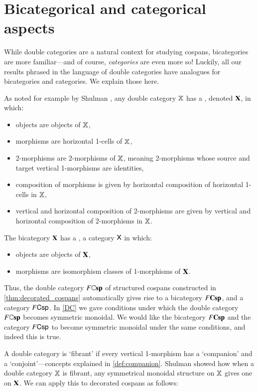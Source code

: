 \documentclass[reqno]{amsart}
\begin{document}
\section{Bicategorical and categorical aspects}
\label{spinoffs}

While double categories are a natural context for studying cospans, bicategories are more 
familiar---and of course, \emph{categories} are even more so!   Luckily, all our results 
phrased in the language of double categories have analogues for bicategories and categories.  
We explain those here.

As noted for example by Shulman \cite{Shulman2010}, any double category $\mathbf{\mathbb X}$ has a 
, denoted $\mathbf{X}$, in which:
\begin{itemize}
\item objects are objects of $\mathbf{\mathbb X}$,
\item morphisms are horizontal 1-cells of $\mathbf{\mathbb X}$,
\item 2-morphisms are  2-morphisms of $\mathbf{\mathbb X}$, meaning 2-morphisms whose source and target vertical 1-morphisms are identities,
\item composition of morphisms is given by horizontal composition of horizontal 1-cells in $\mathbf{\mathbb X}$,
\item vertical and horizontal composition of 2-morphisms are given by vertical and horizontal
composition of 2-morphisms in $\mathbf{\mathbb X}$.
\end{itemize}
The bicategory $\mathbf{X}$ has a , a category $\mathsf{X}$ in which:
\begin{itemize}
\item objects are objects of $\mathbf{X}$,
\item morphisms are isomorphism classes of 1-morphisms of $\mathbf{X}$.   
\end{itemize}
Thus, the double category $F\mathbf{\mathbb Csp}$ of structured cospans constructed in \cref{thm:decorated_cospans} automatically gives rise to a bicategory $F\mathbf{Csp}$, and a category $F\mathsf{Csp}$.   In \cref{DC} we gave conditions under which the double category $F\mathbf{\mathbb Csp}$ becomes symmetric monoidal.   We would like the bicategory $F\mathbf{Csp}$ and the category $F\mathsf{Csp}$ to become symmetric monoidal under the same conditions, and indeed this is true.   

A double category is `fibrant' if every vertical 1-morphism has a `companion' and a `conjoint'---concepts explained in \cref{def:companion}.   Shulman \cite[Thm.\ 1.2]{Shulman2010} showed how when a double category $\mathbf{\mathbb X}$ is fibrant, any symmetrical monoidal structure on $\mathbf{\mathbb X}$ gives one on $\mathbf{X}$.     We can apply this to decorated cospans as follows:
\end{document}
